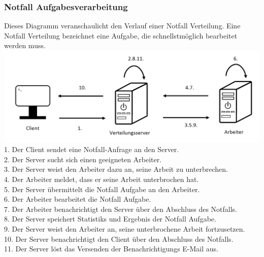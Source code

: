 \documentclass[a4paper,12pt]{article}
\begin{document}
\begin{minipage}[t]{\linewidth}

\subsubsection{Notfall \glspl{Aufgabe}verarbeitung}
Dieses Diagramm veranschaulicht den Verlauf einer Notfall Verteilung. Eine Notfall Verteilung bezeichnet eine \gls{Aufgabe}, die schnellstmöglich bearbeitet werden muss.\\
\includegraphics[width=\linewidth]{Systemmodelle/Models/Emergency-Scheduling.PNG}
\\
1. Der \gls{Client} sendet eine Notfall-Anfrage an den \gls{Server}.\\
2. Der \gls{Server} sucht sich einen geeigneten \gls{Arbeiter}.\\
3. Der \gls{Server} weist den \gls{Arbeiter} dazu an, seine Arbeit zu unterbrechen.\\
4. Der \gls{Arbeiter} meldet, dass er seine Arbeit unterbrochen hat.\\
5. Der \gls{Server} übermittelt die Notfall \gls{Aufgabe} an den \gls{Arbeiter}.\\
6. Der \gls{Arbeiter} bearbeitet die Notfall \gls{Aufgabe}.\\
7. Der \gls{Arbeiter} benachrichtigt den \gls{Server} über den Abschluss des Notfalls.\\
8. Der \gls{Server} speichert \glspl{Statistik} und Ergebnis der Notfall \gls{Aufgabe}.\\
9. Der \gls{Server} weist den \gls{Arbeiter} an, seine unterbrochene Arbeit fortzusetzen.\\
10. Der \gls{Server} benachrichtigt den \gls{Client} über den Abschluss des Notfalls.\\
11. Der \gls{Server} löst das Versenden der Benachrichtigungs E-Mail aus.

\end{minipage}

\clearpage
\end{document}
